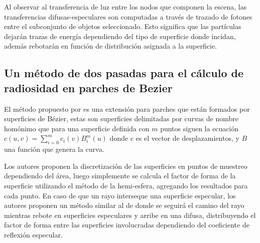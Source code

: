 Al observar al transferencia de luz entre los nodos que componen la escena, las transferencias difusas-especulares son computadas a través de trazado de fotones entre el subconjunto de objetos seleccionado. Esto significa que las partículas dejarán trazas de energía dependiendo del tipo de superficie donde incidan, además rebotarán en función de distribución asignada a la superficie.

\subsection{Un método de dos pasadas para el cálculo de radiosidad en parches de Bezier}

El método propuesto por \citeauthor{Kok} es una extensión para parches que están formados por superficies de Bézier, estas son superficies delimitadas por curvas de nombre homónimo que para una superficie definida con $m$ puntos siguen la ecuación $c(u,v) = \sum_{i=0}^{m} c_{i}(v)B_{i}^{m}(u)$ donde $c$ es el vector de desplazamientos, y $B$ una función que genera la curva.

Los autores proponen la discretización de las superficies en puntos de muestreo dependiendo del área, luego simplemente se calcula el factor de forma de la superficie utilizando el método de la hemi-esfera, agregando los resultados para cada punto. En caso de que un rayo interseque una superficie especular, los autores proponen un método similar al de \citeauthor{Sillion} donde se seguirá el camino del rayo mientras rebote en superficies especulares y arribe en una difusa, distribuyendo el factor de forma entre las superficies involucradas dependiendo del coeficiente de reflexión especular.